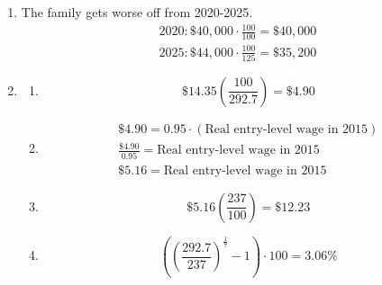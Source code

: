 \documentclass{article}
\begin{document}
\begin{enumerate}

\item  The family gets worse off from 2020-2025.
	\begin{gather*}
	2020 : \$40,000 \cdot \frac{100}{100} = \$40,000 \\
	2025 : \$44,000 \cdot \frac{100}{125} = \$35,200 
	\end{gather*}
	
\item

	\begin{enumerate}
	
	\item \begin{equation*}
		\$14.35 \left( \frac{100}{292.7} \right) = \$4.90
		\end{equation*}
		
	\item \begin{gather*}
		\$4.90 = 0.95 \cdot (\text{Real entry-level wage in 2015}) \\
		\frac{\$4.90}{0.95} = \text{Real entry-level wage in 2015} \\
		\$5.16 = \text{Real entry-level wage in 2015}
		\end{gather*}
		
	\item \begin{equation*}
		\$5.16 \left( \frac{237}{100} \right) = \$12.23
		\end{equation*}
		
	\item \begin{equation*}
		\left( \left( \frac{292.7}{237} \right)^{\frac{1}{7}} - 1 \right) \cdot 100 = 3.06\%
		\end{equation*}
	
	\end{enumerate}
	
\end{enumerate}
\end{document}
